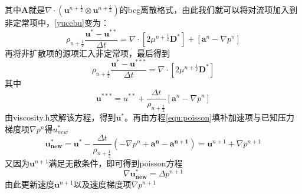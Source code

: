 \documentclass[lang=cn,11pt,a4paper]{elegantpaper}
\begin{document}
其中$\mathbf{A}$就是$\nabla\cdot(\mathbf{u}^{n+\frac{1}{2}}\otimes\mathbf{u}^{n+\frac{1}{2}})$的bcg离散格式，由此我们就可以将对流项加入到非定常项中，\ref{yucebu}变为：
\begin{equation}\label{equ:vis}
    \rho_{n+\frac{1}{2}}\frac{\mathbf{u}^* - \mathbf{u}^{**}}{\Delta t}= \nabla \cdot [2\mu^{n+\frac{1}{2}}\mathbf{D^*}]+[\mathbf{a}^{n}-\nabla p^{n}]
\end{equation}
再将非扩散项的源项汇入非定常项，最后得到
\begin{equation}\label{equ:kuosan}
    \rho_{n+\frac{1}{2}}\frac{\mathbf{u}^* - \mathbf{u}^{***}}{\Delta t}= \nabla \cdot [2\mu^{n+\frac{1}{2}}\mathbf{D^*}]
\end{equation}
其中
\begin{equation}\label{equ:yuanxiangjiazai}
    \mathbf{u}^{***} = u^{**}+\frac{\Delta t}{\rho_{n+\frac{1}{2}}}[\mathbf{a}^{n}-\nabla p^{n}]
\end{equation}
由viscosity.h求解该方程，得到$\mathbf{u^*}$。再由方程\ref{equ:poisson}填补加速项与已知压力梯度项$\nabla p^{n}$得$u^*_{new}$
\begin{equation}\label{equ:sudugengxin}
    \mathbf{u^*_{new}}=\mathbf{u^*}-\frac{\Delta t}{\rho_{n+\frac{1}{2}}}(-\nabla p^{n}+\mathbf{a^{n}}-\mathbf{a^{n+1}}) = \mathbf{u}^{n+1} + \nabla p^{n+ 1}
\end{equation}
又因为$\mathbf{u}^{n+1}$满足无散条件，即可得到poisson方程
\begin{equation}
     \nabla\mathbf{u^*_{new}}=\Delta p^{n+1}
\end{equation}
由此更新速度$\mathbf{u}^{n+1}$以及速度梯度项$\nabla p^{n+1}$
\end{document}
